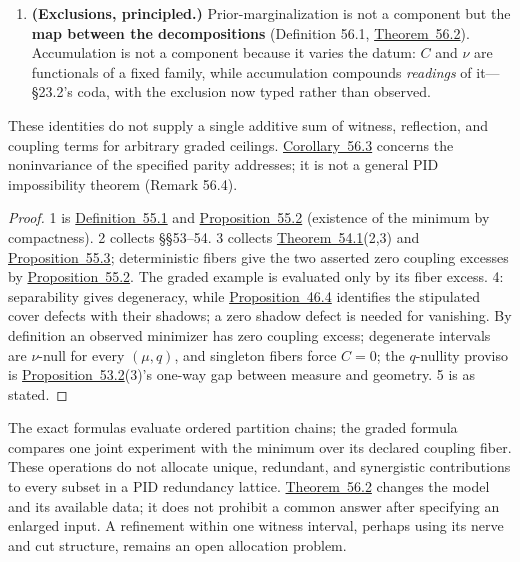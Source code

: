 \begin{thmplain}
\begin{enumerate}
\item
  \textbf{(Exclusions, principled.)} Prior-marginalization is not a component but the \textbf{map between the decompositions} (Definition 56.1, \hyperlink{stmt:56.2}{Theorem~56.2}). Accumulation is not a component because it varies the datum: \(C\) and \(\nu\) are functionals of a fixed family, while accumulation compounds \emph{readings} of it---\hspace{0pt}§23.2's coda, with the exclusion now typed rather than observed.
\end{enumerate}

These identities do not supply a single additive sum of witness, reflection, and coupling terms for arbitrary graded ceilings. \hyperlink{stmt:56.3}{Corollary~56.3} concerns the noninvariance of the specified parity addresses; it is not a general PID impossibility theorem (Remark 56.4).
\end{thmplain}

\begin{proof}

1 is \hyperlink{stmt:55.1}{Definition~55.1} and \hyperlink{stmt:55.2}{Proposition~55.2} (existence of the minimum by compactness). 2 collects §§53--54. 3 collects \hyperlink{stmt:54.1}{Theorem~54.1}(2,3) and \hyperlink{stmt:55.3}{Proposition~55.3}; deterministic fibers give the two asserted zero coupling excesses by \hyperlink{stmt:55.2}{Proposition~55.2}. The graded example is evaluated only by its fiber excess. 4: separability gives degeneracy, while \hyperlink{stmt:46.4}{Proposition~46.4} identifies the stipulated cover defects with their shadows; a zero shadow defect is needed for vanishing. By definition an observed minimizer has zero coupling excess; degenerate intervals are \(\nu\)-null for every \((\mu, q)\), and singleton fibers force \(C = 0\); the \(q\)-nullity proviso is \hyperlink{stmt:53.2}{Proposition~53.2}(3)'s one-way gap between measure and geometry. 5 is as stated.
\end{proof}

\begin{thmrem}

The exact formulas evaluate ordered partition chains; the graded formula compares one joint experiment with the minimum over its declared coupling fiber. These operations do not allocate unique, redundant, and synergistic contributions to every subset in a PID redundancy lattice. \hyperlink{stmt:56.2}{Theorem~56.2} changes the model and its available data; it does not prohibit a common answer after specifying an enlarged input. A refinement within one witness interval, perhaps using its nerve and cut structure, remains an open allocation problem.
\end{thmrem}

